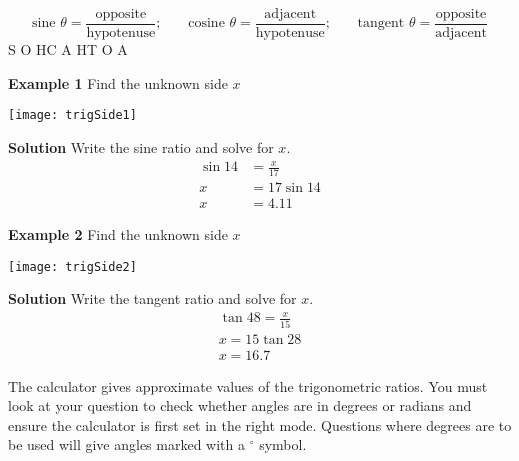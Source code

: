 \begin{tcolorbox}
\begin{equation*}\text{sine }  \theta  =\frac{\text{opposite}}{\text{hypotenuse}}\text{;}\qquad\text{cosine }  \theta  =\frac{\text{adjacent}}{\text{hypotenuse}}\text{;}\qquad\text{tangent }  \theta  =\frac{\text{opposite}}{\text{adjacent}}
\end{equation*}\medskip
\hspace{2.5cm}S O H\hspace{3cm}C A H\hspace{4cm}T O A
\end{tcolorbox}

\begin{multicols}{2}
	\textbf{Example 1} Find the unknown side $x$\\
	\begin{center}
		\texttt{[image: trigSide1]}
	\end{center}

	\columnbreak
\textbf{Solution} Write the sine ratio and solve for $x$.\\
\begin{align*}\sin 14 &= \frac{x}{17}\\
x&=17\sin 14\\
x&=4.11\end{align*}
\end{multicols}

\begin{multicols}{2}
\textbf{Example 2} Find the unknown side $x$\\
\begin{center}
	\texttt{[image: trigSide2]}
\end{center}
	\columnbreak
\textbf{Solution} Write the tangent ratio and solve for $x$.
\begin{align*}\tan 48 = \frac{x}{15}\\
x=15\tan 28\\
x=16.7\end{align*}
\end{multicols}

The calculator gives approximate values of the trigonometric ratios. You must look at your question to check whether angles are in degrees or radians and ensure the calculator is first set in the right mode. Questions where degrees are to be used will give angles marked with a $^\circ$ symbol. 


